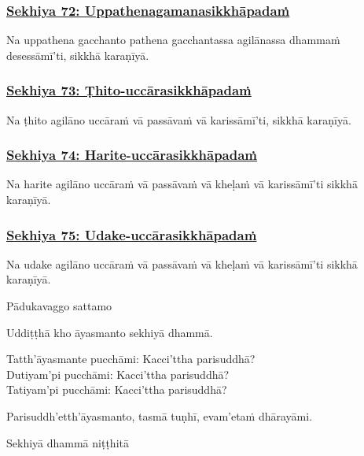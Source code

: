 \subsubsection*{\hyperref[training72]{Sekhiya 72: Uppathenagamanasikkhāpadaṁ}}
\label{sekh72}
Na uppathena gacchanto pathena gacchantassa agilānassa dhammaṁ desessāmī'ti, sikkhā karaṇīyā.

\subsubsection*{\hyperref[training73]{Sekhiya 73: Ṭhito-uccārasikkhāpadaṁ}}
\label{sekh73}
Na ṭhito agilāno uccāraṁ vā passāvaṁ vā karissāmī'ti, sikkhā karaṇīyā.

\subsubsection*{\hyperref[training74]{Sekhiya 74: Harite-uccārasikkhāpadaṁ}}
\label{sekh74}
Na harite agilāno uccāraṁ vā passāvaṁ vā kheḷaṁ vā karissāmī'ti sikkhā karaṇīyā.

\subsubsection*{\hyperref[training75]{Sekhiya 75: Udake-uccārasikkhāpadaṁ}}
\label{sekh75}
Na udake agilāno uccāraṁ vā passāvaṁ vā kheḷaṁ vā karissāmī'ti sikkhā karaṇīyā.

\begin{center}
  Pādukavaggo sattamo
\end{center}

\medskip

\begin{center}
Uddiṭṭhā kho āyasmanto sekhiyā dhammā.

\smallskip

Tatth'āyasmante pucchāmi: Kacci'ttha parisuddhā?\\
Dutiyam'pi pucchāmi: Kacci'ttha parisuddhā?\\
Tatiyam'pi pucchāmi: Kacci'ttha parisuddhā?

\smallskip

Parisuddh'etth'āyasmanto, tasmā tuṇhī, evam'etaṁ dhārayāmi.
\end{center}

\begin{outro}
  Sekhiyā dhammā niṭṭhitā
\end{outro}

\clearpage
